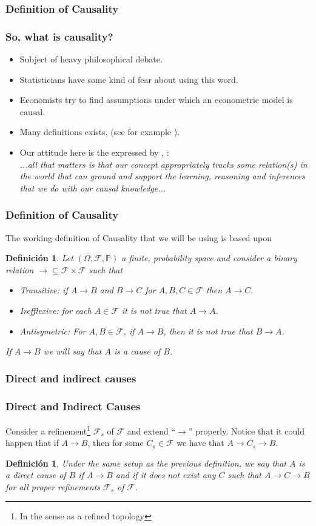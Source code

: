 \documentclass{beamer}
\theoremstyle{plain}
\newtheorem{defi}[teo]{Definición}
\begin{document}
		\subsubsection{Definition of Causality}
		\begin{frame}
		\frametitle{So, what is causality?}
		\begin{itemize}
		\item Subject of heavy philosophical debate.
		\item Statisticians have some kind of fear about using this word.
		\item Economists try to find assumptions under which an econometric model is causal.
		\item Many definitions exists, (see for example \cite{arlo2016readings}).
		\item Our attitude here is the expressed by \cite{danks2013functions}, \cite{danks2014unifying}:\\
		\textit{...all that matters is that our concept appropriately tracks some relation(s) in the world that can ground and support the learning, reasoning and inferences that we do with our causal knowledge...}
		\end{itemize}
		\end{frame}
		\begin{frame}
		\frametitle{Definition of Causality}
		The working definition of Causality that we will be using is based upon \cite{spirtes2000causation}
		\begin{defi}
		Let $(\Omega, \mathcal{F}, \mathbb{P})$ a finite, probability space and consider a binary relation  $\to  \subseteq \mathcal{F} \times \mathcal{F}$ such that
		\begin{itemize}
		\item Transitive: if $A \to B$ and $B \to C$ for $A,B,C \in \mathcal{F}$ then $A \to C$.
		\item  Irefflexive: for each $A \in \mathcal{F}$ it is not true that $A \to A$.
		\item Antisymetric: For $A, B \in \mathcal{F}$, if $A \to B$, then it is not true that $B \to A$.
		\end{itemize}
		If $A \to B$ we will say that $A$ is a cause of $B$.
		\end{defi}
		\end{frame}
		\subsubsection{Direct and indirect causes}
		\begin{frame}
		\frametitle{Direct and Indirect Causes}
		Consider a refinement\footnote{In the sense as a refined topology} $\mathcal{F}_s$ of $\mathcal{F}$ and extend “$\to$” properly. Notice that it could happen that if $A \to B$, then for some $C_s \in \mathcal{F}$ we have that $A \to C_s \to B$. 
		\begin{defi}
		Under the same setup as the previous definition, we say that $A$ is a direct cause of $B$ if $A \to B$ and if it does not exist any $C$ such that $A \to C \to B$ for all proper refinements $\mathcal{F}_s$ of $\mathcal{F}$.
		\end{defi}
		\end{frame}
\end{document}
